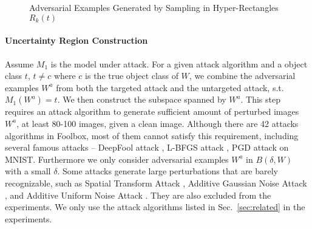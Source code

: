 \documentclass[12pt]{article}
\begin{document}
%
\begin{figure}[t]
\centering
{}
\centering
{}
\centering
{}
\\
\centering
{}
\centering
{}
\centering
{}
\\
\centering
{}
\centering
{}
\centering
{}
\caption{Adversarial Examples Generated by Sampling in
  Hyper-Rectangles $R_k(t)$}
\label{fig:delta-ball-images}
\end{figure}

%
\paragraph{Uncertainty Region Construction}
Assume $M_1$ is the model under attack. 
For a given attack algorithm and a object class $t$, $t\neq c$ where
$c$ is the true object class of $W$, we
combine the adversarial examples $W^a$ from both the targeted attack
and the untargeted attack, s.t. $M_1(W^a)=t$. We then construct the
subspace spanned by $W^a$. This step requires an attack algorithm to
generate sufficient amount of perturbed images $W^a$, at least 80-100
images, given a clean
image. Although there are 42 attacks
algorithms in Foolbox, most of them cannot satisfy this requirement,
including several famous attacks -- DeepFool attack 
\cite{attack-deepfool}, L-BFGS attack \cite{attack-LBFGS}, PGD attack 
\cite{attack-PGD} on MNIST. Furthermore we only consider adversarial examples
$W^a$ in $B(\delta,W)$ with a small $\delta$. Some attacks generate
large perturbations that are barely recognizable, such as Spatial
Transform Attack \cite{attack-spatial}, 
Additive Gaussian Noise Attack \cite{foolbox-2017}, and
Additive Uniform Noise Attack \cite{foolbox-2017}. They are also
excluded from the experiments. We only use the attack algorithms
listed in Sec.~\ref{sec:related} in the experiments. 
\end{document}
